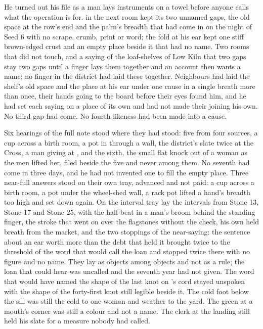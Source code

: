 He turned out his file as a man lays instruments on a towel before anyone calls what the operation is for.  in the next room kept its two unnamed gaps, the old space at the row's end and the palm's breadth that had come in on the night of Seed 6 with no scrape, crumb, print or word; the fold at his ear kept one stiff brown-edged crust and an empty place beside it that had no name. Two rooms that did not touch, and a saying of the loaf-shelves of Low Kiln that two gaps stay two gaps until a finger lays them together and an account then wants a name; no finger in the district had laid these together. Neighbours had laid the shelf's old space and the place at his ear under one cause in a single breath more than once, their hands going to the board before their eyes found him, and he had set each saying on a place of its own and had not made their joining his own. No third gap had come. No fourth likeness had been made into a cause.

Six hearings of the full note stood where they had stood: five from four sources, a cup across a birth room, a pot in  through a wall, the district's slate twice at the Cross, a man giving at , and the sixth, the small flat knock out of a woman as the men lifted her, filed beside the five and never among them. No seventh had come in three days, and he had not invented one to fill the empty place. Three near-full answers stood on their own tray, advanced and not paid: a cup across a birth room, a pot under the wheel-shed wall, a rack pot lifted a hand's breadth too high and set down again. On the interval tray lay the intervals from Stone 13, Stone 17 and Stone 25, with the half-beat in a man's broom behind the standing finger, the stroke that went on over the flagstones without the check, his own held breath from the market, and the two stoppings of the near-saying: the sentence about an ear worth more than the debt that held it brought twice to the threshold of the word that would call the loan and stopped twice there with no figure and no name. They lay as objects among objects and not as a rule; the loan that could hear was uncalled and the seventh year had not given. The word that would have named the shape of the last knot on 's cord stayed unspoken with the shape of the forty-first knot still legible beside it. The cold foot below the sill was still the cold to one woman and weather to the yard. The green at a mouth's corner was still a colour and not a name. The clerk at the landing still held his slate for a measure nobody had called.

